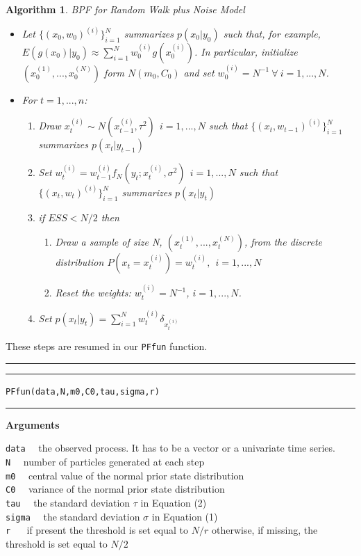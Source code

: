 \documentclass[
]{book}
\theoremstyle{break}
\theoremstyle{nonumberplain}
\newtheorem{algorithm}{Algorithm}[section]
\begin{document}
\begin{algorithm} BPF for Random Walk plus Noise Model
\begin{itemize}
\item Let $\{(x_{0},w_{0})^{(i)}\}_{i=1}^{N}$ summarizes $p(x_{0}|y_{0})$ such that, for example, $E(g(x_{0})|y_{0}) \approx \sum_{i=1}^{N}w_{0}^{(i)}g(x_{0}^{(i)})$. In particular, initialize $(x_{0}^{(1)},...,x_{0}^{(N)})$ form $N(m_{0},C_{0})$ and set $w_{0}^{(i)}=N^{-1} \ \forall \ i=1,...,N$.
\item For $t=1,...,n$:
\begin{enumerate}
\item Draw $x_{t}^{(i)} \sim N(x_{t-1}^{(i)},\tau^2) \ \ i=1,...,N$ such that $\{(x_{t},w_{t-1})^{(i)}\}_{i=1}^{N}$ summarizes $p(x_{t}|y_{t-1})$
\item Set $w_{t}^{(i)} = w_{t-1}^{(i)}f_{N}(y_{t};x_{t}^{(i)},\sigma^2) \ \ i=1,...,N$ such that $\{(x_{t},w_{t})^{(i)}\}_{i=1}^{N}$ summarizes $p(x_{t}|y_{t})$
\item if $ESS<N/2$ then
\begin{enumerate}
\item Draw a sample of size N, $(x_{t}^{(1)},...,x_{t}^{(N)})$, from the discrete distribution $P(x_{t}=x_{t}^{(i)})=w_{t}^{(i)},\ \ i=1,...,N$
\item Reset the weights: $w_{t}^{(i)}=N^{-1}$, $i=1,...,N$.
\end{enumerate}
\item Set $p(x_{t}|y_{t})=\sum_{i=1}^{N}w_{t}^{(i)}\delta_{x_{t}^{(i)}}$
\end{enumerate}
\end{itemize}
\end{algorithm}

These steps are resumed in our \texttt{PFfun} function.\\

\hrule
\hrule
\texttt{PFfun(data,N,m0,C0,tau,sigma,r)}
\hrule

\textbf{Arguments}

\texttt{data} ~~the observed process. It has to be a vector or a
univariate time series.\\
\texttt{N} ~~number of particles generated at each step\\
\texttt{m0} ~~central value of the normal prior state distribution\\
\texttt{C0} ~~variance of the normal prior state distribution\\
\texttt{tau} ~~the standard deviation \(\tau\) in Equation (2)\\
\texttt{sigma} ~~the standard deviation \(\sigma\) in Equation (1)\\
\texttt{r} ~~ if present the threshold is set equal to \(N/r\)
otherwise, if missing, the threshold is set equal to \(N/2\)
\end{document}
